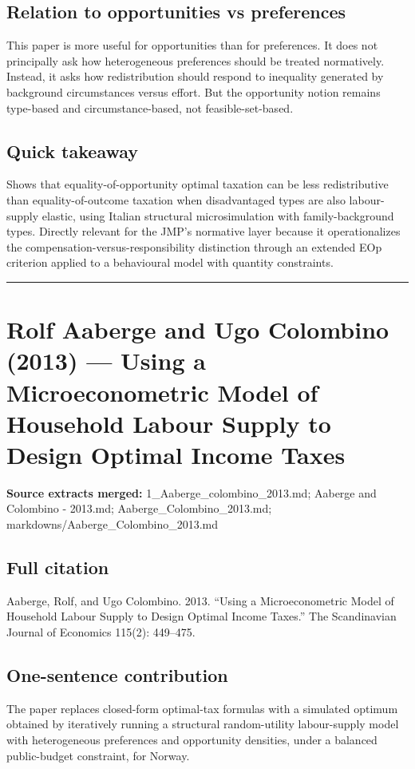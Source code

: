 \documentclass[11pt,a4paper]{article}
\begin{document}
\subsection*{Relation to opportunities vs preferences}
This paper is more useful for opportunities than for preferences. It does not principally ask how heterogeneous preferences should be treated normatively. Instead, it asks how redistribution should respond to inequality generated by background circumstances versus effort. But the opportunity notion remains type-based and circumstance-based, not feasible-set-based.

\subsection*{Quick takeaway}
Shows that equality-of-opportunity optimal taxation can be less redistributive than equality-of-outcome taxation when disadvantaged types are also labour-supply elastic, using Italian structural microsimulation with family-background types. Directly relevant for the JMP's normative layer because it operationalizes the compensation-versus-responsibility distinction through an extended EOp criterion applied to a behavioural model with quantity constraints.


\medskip\hrule\medskip

\section*{Rolf Aaberge and Ugo Colombino (2013) — Using a Microeconometric Model of Household Labour Supply to Design Optimal Income Taxes}

\textbf{Source extracts merged:} 1\_Aaberge\_colombino\_2013.md; Aaberge and Colombino - 2013.md; Aaberge\_Colombino\_2013.md; markdowns/Aaberge\_Colombino\_2013.md

\subsection*{Full citation}
Aaberge, Rolf, and Ugo Colombino. 2013. “Using a Microeconometric Model of Household Labour Supply to Design Optimal Income Taxes.” The Scandinavian Journal of Economics 115(2): 449–475.

\subsection*{One-sentence contribution}
The paper replaces closed-form optimal-tax formulas with a simulated optimum obtained by iteratively running a structural random-utility labour-supply model with heterogeneous preferences and opportunity densities, under a balanced public-budget constraint, for Norway.
\end{document}
